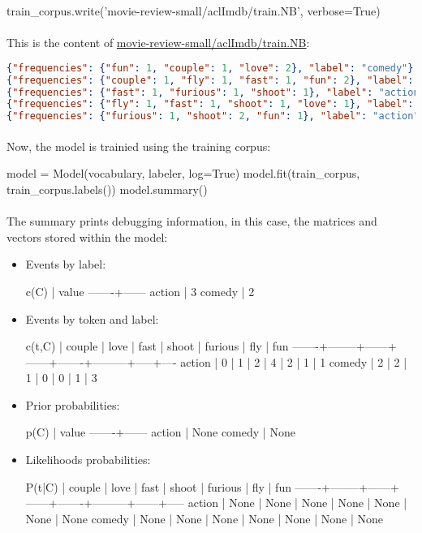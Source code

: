 \documentclass{article}
\begin{document}
\begin{python}
train_corpus.write('movie-review-small/aclImdb/train.NB', verbose=True)
\end{python}

\paragraph{} This is the content of \url{movie-review-small/aclImdb/train.NB}:

\begin{lstlisting}[language=json,firstnumber=1]
{"frequencies": {"fun": 1, "couple": 1, "love": 2}, "label": "comedy"}
{"frequencies": {"couple": 1, "fly": 1, "fast": 1, "fun": 2}, "label": "comedy"}
{"frequencies": {"fast": 1, "furious": 1, "shoot": 1}, "label": "action"}
{"frequencies": {"fly": 1, "fast": 1, "shoot": 1, "love": 1}, "label": "action"}
{"frequencies": {"furious": 1, "shoot": 2, "fun": 1}, "label": "action"}
\end{lstlisting}

\paragraph{} Now, the model is trainied using the training corpus:

\begin{python}
model = Model(vocabulary, labeler, log=True)
model.fit(train_corpus, train_corpus.labels())
model.summary()
\end{python}

\paragraph{} The summary prints debugging information, in this case, the matrices and vectors stored within the model:

\begin{itemize}
\item Events by label:
\begin{python}
c(C)   | value
-------+------
action |     3
comedy |     2
\end{python}
\item Events by token and label:
\begin{python}
c(t,C) | couple | love | fast | shoot | furious | fly | fun
-------+--------+------+------+-------+---------+-----+----
action |      0 |    1 |    2 |     4 |       2 |   1 |   1
comedy |      2 |    2 |    1 |     0 |       0 |   1 |   3
\end{python}
\item Prior probabilities:
\begin{python}
p(C)   | value
-------+------
action |  None
comedy |  None
\end{python}
\item Likelihoods probabilities:
\begin{python}
P(t|C) | couple | love | fast | shoot | furious |  fly |  fun
-------+--------+------+------+-------+---------+------+-----
action |   None | None | None |  None |    None | None | None
comedy |   None | None | None |  None |    None | None | None
\end{python}
\end{itemize}
\end{document}
